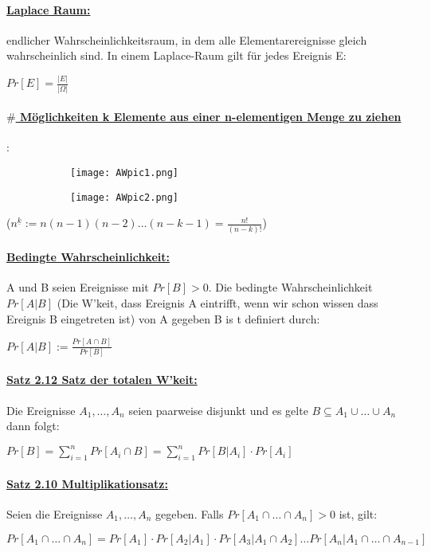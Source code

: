 \documentclass[8pt]{extreport}
\begin{document}
\paragraph{\underline{Laplace Raum:}} endlicher Wahrscheinlichkeitsraum, in dem alle Elementarereignisse gleich wahrscheinlich sind.
In einem Laplace-Raum gilt für jedes Ereignis E: 
\begin{center}
$Pr[E] = \frac{|E|}{|\Omega|}$
\end{center}
\paragraph{\underline{$\#$ Möglichkeiten k Elemente aus einer n-elementigen Menge zu ziehen}}:
\begin{figure}[h!]
	\centering
	\begin{subfigure}[b]{0.4\linewidth}
	\texttt{[image: AWpic1.png]}
	\caption{}
	\label{ziehungsmoglichkeiten}
	\end{subfigure}
	\begin{subfigure}[b]{0.4\linewidth}
	\texttt{[image: AWpic2.png]}
	\caption{}
	\label{ziehungsmoglichkeiten}
	\end{subfigure}
\end{figure}
($n^{\underline{k}} := n(n-1)(n-2) \dots (n-k-1) = \frac{n!}{(n-k)!}$)
\paragraph{\underline{Bedingte Wahrscheinlichkeit:}} A und B seien Ereignisse mit $Pr[B] > 0$. Die bedingte Wahrscheinlichkeit $Pr[A|B]$ (Die W'keit, dass Ereignis A eintrifft, wenn wir schon wissen dass Ereignis B eingetreten ist) von A gegeben B is t definiert durch:
\begin{center}
$Pr[A|B] := \frac{Pr[A\cap B]}{Pr[B]}$
\end{center}
\paragraph{\underline{Satz 2.12 Satz der totalen W'keit:}} Die Ereignisse $A_1,\dots,A_n$ seien paarweise disjunkt und es gelte $B \subseteq A_1 \cup \dots \cup A_n$ dann folgt:
\begin{center}
$Pr[B] =\displaystyle\sum_{i=1}^{n}Pr[A_{i} \cap B] = \displaystyle\sum_{i=1}^{n} Pr[B|A_i] \cdot Pr[A_i]$
\end{center}
\paragraph{\underline{Satz 2.10 Multiplikationsatz:}} Seien die Ereignisse $A_1,\dots, A_n$ gegeben. Falls $Pr[A_1 \cap \dots \cap A_n] > 0$ ist, gilt:
\begin{center}
$Pr[A_1 \cap \dots \cap A_n] = Pr[A_1] \cdot Pr[A_2|A_1] \cdot Pr[A_3|A_1 \cap A_2] \dots Pr[A_n|A_1\cap \dots \cap A_{n-1}]$
\end{center}
\end{document}
